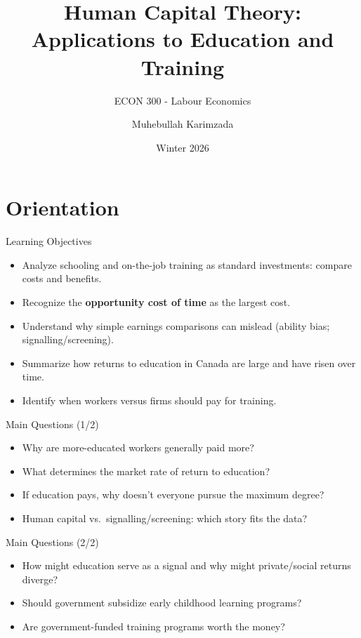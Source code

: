 \documentclass[aspectratio=169]{beamer}
\title{\textbf{Human Capital Theory: Applications to Education and Training \vspace{.5cm}\\  }}
\subtitle{ {\large ECON 300 - Labour Economics}}
\author{Muhebullah Karimzada}
\date{Winter 2026}
\begin{document}
\begin{frame}[plain]
  \titlepage
\end{frame}

\section{Orientation}

\begin{frame}{Learning Objectives}
\transfade
\begin{itemize}[<+->]
  \item Analyze schooling and on-the-job training as standard investments: compare costs and benefits.
  \item Recognize the \textbf{opportunity cost of time} as the largest cost.
  \item Understand why simple earnings comparisons can mislead (ability bias; signalling/screening).
  \item Summarize how returns to education in Canada are large and have risen over time.
  \item Identify when workers versus firms should pay for training.
\end{itemize}
\end{frame}

\begin{frame}{Main Questions (1/2)}
\transfade
\begin{itemize}[<+->]
  \item Why are more-educated workers generally paid more?
  \item What determines the market rate of return to education?
  \item If education pays, why doesn’t everyone pursue the maximum degree?
  \item Human capital vs.\ signalling/screening: which story fits the data?
\end{itemize}
\end{frame}

\begin{frame}{Main Questions (2/2)}
\transfade
\begin{itemize}[<+->]
  \item How might education serve as a signal and why might private/social returns diverge?
  \item Should government subsidize early childhood learning programs?
  \item Are government-funded training programs worth the money?
\end{itemize}
\end{frame}
\end{document}
